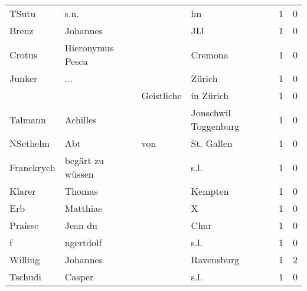 \begin{tabular}{llllrr}
                    TSutu &                               s.n. &             &                                          hn &          1 &         0 \\
                    Brenz &                           Johannes &             &                                         JIJ &          1 &         0 \\
                   Crotus &                   Hieronymus Pesca &             &                                     Cremona &          1 &         0 \\
                   Junker &                                ... &             &                                      Zürich &          1 &         0 \\
                          &                                    &  Geistliche &                                   in Zürich &          1 &         0 \\
                  Talmann &                           Achilles &             &                        Jonschwil Toggenburg &          1 &         0 \\
                 NSethelm &                                Abt &         von &                                  St. Gallen &          1 &         0 \\
               Franckrych &                   begärt zu wüssen &             &                                        s.l. &          1 &         0 \\
                   Klarer &                             Thomas &             &                                     Kempten &          1 &         0 \\
                      Erb &                           Matthias &             &                                           X &          1 &         0 \\
                  Praisse &                            Jean du &             &                                        Chur &          1 &         0 \\
                        f &                          ngertdolf &             &                                        s.l. &          1 &         0 \\
                  Willing &                           Johannes &             &                                  Ravensburg &          1 &         2 \\
                  Tschudi &                             Casper &             &                                        s.l. &          1 &         0 \\

\end{tabular}
